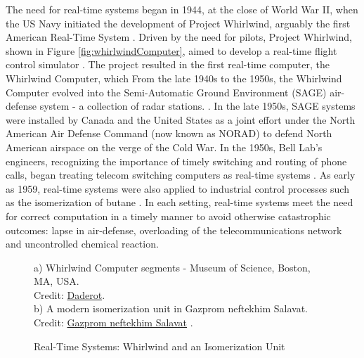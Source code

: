 The need for real-time systems began in 1944, at the close of World War II, when the US Navy initiated the development of Project Whirlwind, arguably the first American Real-Time System \cite{laplante_historical_1995}.
Driven by the need for pilots, Project Whirlwind, shown in Figure \ref{fig:whirlwindComputer}, aimed to develop a real-time flight control simulator \cite{forrester_whirlwind_1990}.
The project resulted in the first real-time computer, the Whirlwind Computer, which 
From the late 1940s to the 1950s, the Whirlwind Computer evolved into the Semi-Automatic Ground Environment (SAGE) air-defense system - a collection of radar stations. \cite{noauthor_tales_nodate}.
In the late 1950s, SAGE systems were installed by Canada and the United States as a joint effort under the North American Air Defense Command (now known as NORAD) to defend North American airspace on the verge of the Cold War\cite{north_american_aerospace_defense_command_brief_nodate}.
In the 1950s, Bell Lab's engineers, recognizing the importance of timely switching and routing of phone calls, began treating telecom switching computers as real-time systems \cite{joel_communication_1957}.
As early as 1959, real-time systems were also applied to industrial control processes such as the isomerization of butane \cite{harrison_evolution_1981-1,stout_computer_1959}.
In each setting, real-time systems meet the need for correct computation in a timely manner to avoid otherwise catastrophic outcomes: lapse in air-defense, overloading of the telecommunications network and uncontrolled chemical reaction.

\begin{figure}
    \centering
    \caption{Real-Time Systems: Whirlwind and an Isomerization Unit}
    a) Whirlwind Computer segments - Museum of Science, Boston, MA, USA.\\
    Credit: \href{https://commons.wikimedia.org/wiki/User:Daderot}{Daderot}\cite{daderot_whirlwind_2010}.\\
    b) A modern isomerization unit in Gazprom neftekhim Salavat.\\
    Credit: \href{https://salavat-neftekhim.gazprom.com/press/news/2017/06/36/}{Gazprom neftekhim Salavat} \cite{gazprom_neftekhim_salavat_state---art_2017}.
\end{figure}

